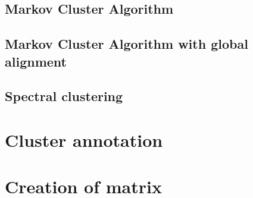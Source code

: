 \subsection{Markov Cluster Algorithm}
\subsection{Markov Cluster Algorithm with global alignment}
\subsection{Spectral clustering}

\section{Cluster annotation}

\section{Creation of matrix}
